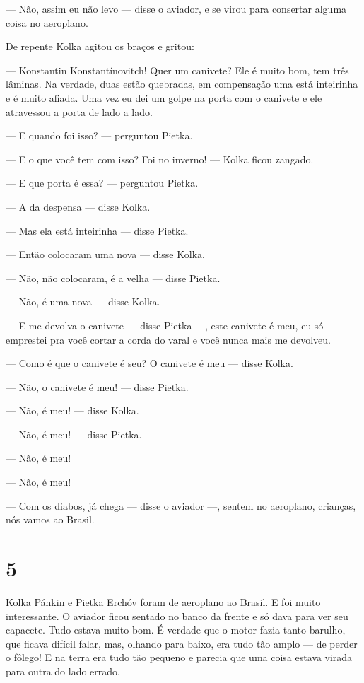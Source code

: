 --- Não, assim eu não levo --- disse o aviador, e se virou para
consertar alguma coisa no aeroplano.

De repente Kolka agitou os braços e gritou:

--- Konstantin Konstantínovitch! Quer um canivete? Ele é muito bom, tem
três lâminas. Na verdade, duas estão quebra­das, em compensação uma está
inteirinha e é muito afiada. Uma vez eu dei um golpe na porta com o
canivete e ele atravessou a porta de lado a lado.

--- E quando foi isso? --- perguntou Pietka.

--- E o que você tem com isso? Foi no inverno! --- Kolka ficou zangado.

--- E que porta é essa? --- perguntou Pietka.

--- A da despensa --- disse Kolka.

--- Mas ela está inteirinha --- disse Pietka.

--- Então colocaram uma nova --- disse Kolka.

--- Não, não colocaram, é a velha --- disse Pietka.

--- Não, é uma nova --- disse Kolka.

--- E me devolva o canivete --- disse Pietka ---, este canivete é meu,
eu só emprestei pra você cortar a corda do varal e você nunca mais me
devolveu.

--- Como é que o canivete é seu? O canivete é meu --- disse Kolka.

--- Não, o canivete é meu! --- disse Pietka.

--- Não, é meu! --- disse Kolka.

--- Não, é meu! --- disse Pietka.

--- Não, é meu!

--- Não, é meu!

--- Com os diabos, já chega --- disse o aviador ---, sentem no
aeroplano, crianças, nós vamos ao Brasil.

\section{5}

Kolka Pánkin e Pietka Erchóv foram de aeroplano ao Brasil. E foi muito
interessante. O aviador ficou sentado no banco da frente e só dava para
ver seu capacete. Tudo estava muito bom. É verdade que o motor fazia
tanto barulho, que ficava difícil fa­lar, mas, olhando para baixo, era
tudo tão amplo --- de perder o fôlego! E na terra era tudo tão pequeno e
parecia que uma coisa estava virada para outra do lado errado.

